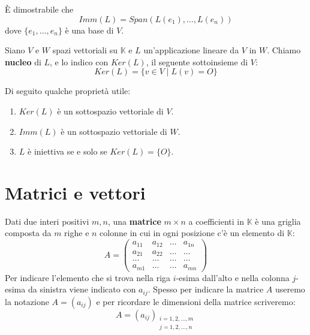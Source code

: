 \begin{proposition}
	\`E dimostrabile che \[ Imm(L) = Span(L(e_1), \dots, L(e_n)) \]
	dove $\{e_1, \dots, e_n\}$ \`e una base di $V$.
\end{proposition}

\begin{definition}
	Siano $V$ e $W$ spazi vettoriali su $\mathbb{K}$ e $L$ un'applicazione
	lineare da $V$ in $W$. Chiamo \textbf{nucleo} di $L$, e lo indico con
	$Ker(L)$, il seguente sottoinsieme di $V$:
	\begin{equation*}
		Ker(L) = \{v \in V \mid L(v) = O\}
	\end{equation*}
\end{definition}

Di seguito qualche propriet\`a utile:
\begin{enumerate}
	\item $Ker(L)$ \`e un sottospazio vettoriale di $V$.
	\item $Imm(L)$ \`e un sottospazio vettoriale di $W$.
	\item $L$ \`e iniettiva se e solo se $Ker(L) = \{O\}$.
\end{enumerate}

\section{Matrici e vettori}

\begin{definition}
	Dati due interi positivi $m, n$, una \textbf{matrice} $m \times n$
	a coefficienti in $\mathbb{K}$ \`e una griglia composta da $m$ righe
	e $n$ colonne in cui in ogni posizione c'\`e un elemento di
	$\mathbb{K}$:
	\begin{equation*}
		A = \begin{pmatrix}
			a_{11} & a_{12} & \dots & a_{1n} \\
			a_{21} & a_{22} & \dots & \dots  \\
			\dots  & \dots  & \dots & \dots  \\
			a_{m1} & \dots  & \dots & a_{mn}
		\end{pmatrix}
	\end{equation*}
	Per indicare l'elemento che si trova nella riga $i$-esima
	dall'alto e	nella colonna $j$-esima da sinistra viene indicato
	con $a_{ij}$. Spesso per indicare la matrice $A$ useremo la notazione
	$A = (a_{ij})$ e per ricordare le dimensioni della matrice scriveremo:
	\begin{equation*}
		A = (a_{ij})_{\substack{
					i = 1, 2, \dots, m \\
					j = 1, 2, \dots, n
				}}
	\end{equation*}
\end{definition}

